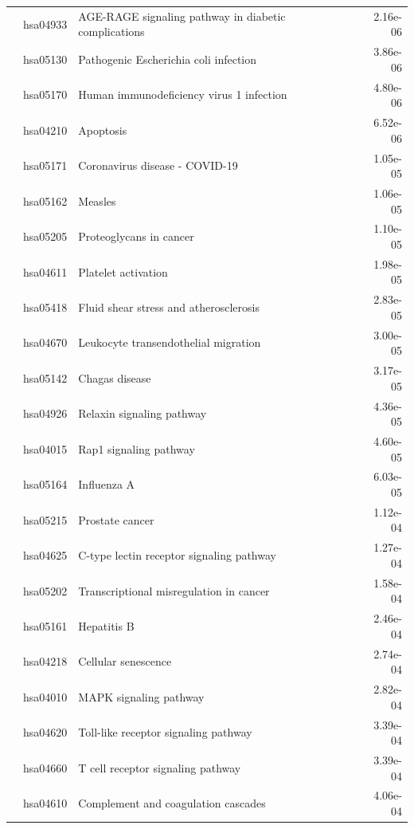 \begin{longtable}{cllr}
 & hsa04933 & \textcolor{\clrnew}{AGE-RAGE signaling pathway in diabetic complications} & 2.16e-06 \\ 
 & hsa05130 & \textcolor{\clrnew}{Pathogenic Escherichia coli infection} & 3.86e-06 \\ 
 & hsa05170 & \textcolor{\clrnew}{Human immunodeficiency virus 1 infection} & 4.80e-06 \\ 
 & hsa04210 & \textcolor{\clrnew}{Apoptosis} & 6.52e-06 \\ 
 & hsa05171 & \textcolor{\clrnew}{Coronavirus disease - COVID-19} & 1.05e-05 \\ 
 & hsa05162 & \textcolor{\clrnew}{Measles} & 1.06e-05 \\ 
 & hsa05205 & \textcolor{\clrnew}{Proteoglycans in cancer} & 1.10e-05 \\ 
 & hsa04611 & \textcolor{\clrnew}{Platelet activation} & 1.98e-05 \\ 
 & hsa05418 & \textcolor{\clrnew}{Fluid shear stress and atherosclerosis} & 2.83e-05 \\ 
 & hsa04670 & \textcolor{\clrnew}{Leukocyte transendothelial migration} & 3.00e-05 \\ 
 & hsa05142 & \textcolor{\clrnew}{Chagas disease} & 3.17e-05 \\ 
 & hsa04926 & \textcolor{\clrnew}{Relaxin signaling pathway} & 4.36e-05 \\ 
 & hsa04015 & \textcolor{\clrnew}{Rap1 signaling pathway} & 4.60e-05 \\ 
 & hsa05164 & \textcolor{\clrnew}{Influenza A} & 6.03e-05 \\ 
 & hsa05215 & \textcolor{\clrnew}{Prostate cancer} & 1.12e-04 \\ 
 & hsa04625 & \textcolor{\clrnew}{C-type lectin receptor signaling pathway} & 1.27e-04 \\ 
 & hsa05202 & \textcolor{\clrnew}{Transcriptional misregulation in cancer} & 1.58e-04 \\ 
 & hsa05161 & \textcolor{\clrnew}{Hepatitis B} & 2.46e-04 \\ 
 & hsa04218 & \textcolor{\clrnew}{Cellular senescence} & 2.74e-04 \\ 
 & hsa04010 & \textcolor{\clrnew}{MAPK signaling pathway} & 2.82e-04 \\ 
 & hsa04620 & \textcolor{\clrnew}{Toll-like receptor signaling pathway} & 3.39e-04 \\ 
 & hsa04660 & \textcolor{\clrnew}{T cell receptor signaling pathway} & 3.39e-04 \\ 
 & hsa04610 & \textcolor{\clrnew}{Complement and coagulation cascades} & 4.06e-04 \\ 

\end{longtable}
